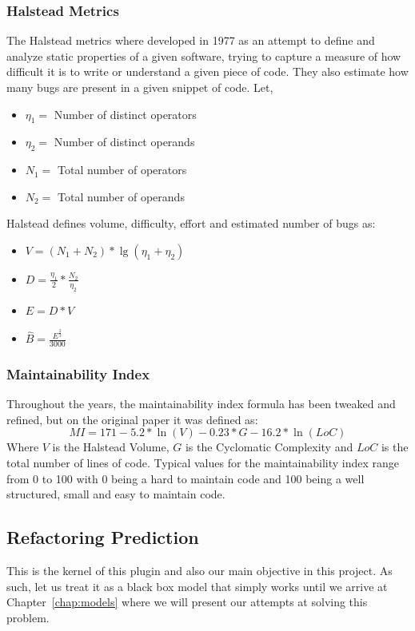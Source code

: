 \subsubsection{Halstead Metrics}
The Halstead metrics where developed in 1977 \citep{halstead} as an attempt to define and analyze static properties of a given software, trying to capture a measure of how difficult it is to write or understand a given piece of code. They also estimate how many bugs are present in a given snippet of code.
Let,
\begin{itemize}
    \item[] $\eta_{1}=$ Number of distinct operators     
    \item[] $\eta_{2}=$ Number of distinct operands
    \item[] $N_{1}=$ Total number of operators
    \item[] $N_{2}=$ Total number of operands
\end{itemize}
Halstead defines volume, difficulty, effort and estimated number of bugs as:
\begin{itemize}
    \item[] $V = (N_{1} + N_{2}) * \lg (\eta_{1} + \eta_{2})$ 
    \item[] $D = \frac{\eta_{1}}{2} * \frac{N_{2}}{\eta_{2}} $
    \item[] $E = D*V$
    \item[] $\hat{B} = \frac{ E^{\frac{2}{3}} } {3000}  $
\end{itemize}

\subsubsection{Maintainability Index}
Throughout the years, the maintainability index formula has been tweaked and refined, but on the original paper \citep{maintainability_index} it was defined as:
$$ MI = 171 - 5.2 * \ln (V)  - 0.23 * G - 16.2 * \ln (LoC) $$
Where $V$ is the Halstead Volume, $G$ is the Cyclomatic Complexity and $LoC$ is the total number of lines of code.
Typical values for the maintainability index range from 0 to 100 with 0 being a hard to maintain code and 100 being a well structured, small and easy to maintain code.


\subsection{Refactoring Prediction}

This is the kernel of this plugin and also our main objective in this project. As such, let us treat it as a black box model that simply works until we arrive at Chapter~\ref{chap:models} where we will present our attempts at solving this problem. 


